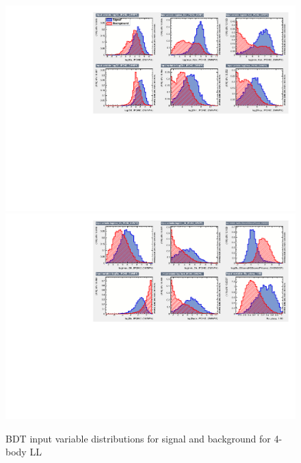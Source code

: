 \begin{figure}[tb]
\includegraphics[width=\linewidth]{figures/selection/inputvariables_KPiPiPi_LL_run2_1.pdf}
\includegraphics[width=\linewidth]{figures/selection/inputvariables_KPiPiPi_LL_run2_2.pdf}
\caption{BDT input variable distributions for signal and background for 4-body LL}
\label{BDTinputdist4bodyLL}
\end{figure}

